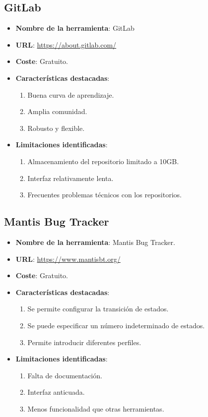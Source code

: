 \subsection{GitLab}

\begin{itemize}
	\item \textbf{Nombre de la herramienta}: GitLab
	\item \textbf{URL}: \url{https://about.gitlab.com/}
	\item \textbf{Coste}: Gratuito.
	\item \textbf{Características destacadas}:
	\begin{enumerate}
		\item Buena curva de aprendizaje.
		\item Amplia comunidad.
		\item Robusto y flexible.
	\end{enumerate}
	\item \textbf{Limitaciones identificadas}:
	\begin{enumerate}
		\item Almacenamiento del repositorio limitado a 10GB.
		\item Interfaz relativamente lenta.
		\item Frecuentes problemas técnicos con los repositorios.
	\end{enumerate}
\end{itemize}

\subsection{Mantis Bug Tracker}

\begin{itemize}
	\item \textbf{Nombre de la herramienta}: Mantis Bug Tracker.
	\item \textbf{URL}: \url{https://www.mantisbt.org/}
	\item \textbf{Coste}: Gratuito.
	\item \textbf{Características destacadas}:
	\begin{enumerate}
		\item Se permite configurar la transición de estados.
		\item Se puede especificar un número indeterminado de estados.
		\item Permite introducir diferentes perfiles.
	\end{enumerate}
	\item \textbf{Limitaciones identificadas}:
	\begin{enumerate}
		\item Falta de documentación.
		\item Interfaz anticuada.
		\item Menos funcionalidad que otras herramientas.
	\end{enumerate}
\end{itemize}


